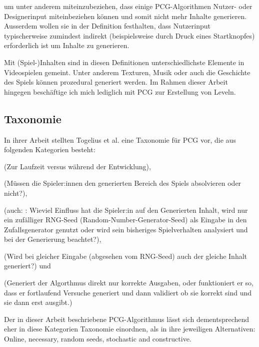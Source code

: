 um unter anderem miteinzubeziehen, dass einige PCG-Algorithmen Nutzer- oder Designerinput miteinbeziehen können und somit nicht mehr  Inhalte generieren. Ausserdem wollen sie in der Definition festhalten, dass Nutzerinput typischerweise zumindest indirekt (beispielsweise durch Druck eines Startknopfes) erforderlich ist um Inhalte zu generieren.

Mit (Spiel-)Inhalten sind in diesen Definitionen unterschiedlichste Elemente in Videospielen gemeint. Unter anderem Texturen, Musik oder auch die Geschichte des Spiels können prozedural generiert werden. Im Rahmen dieser Arbeit hingegen beschäftige ich mich lediglich mit PCG zur Erstellung von Leveln.

\subsection{Taxonomie}

In ihrer Arbeit \cite{sbpcg} stellten Togelius et al. eine Taxonomie für PCG vor, die aus folgenden Kategorien besteht:

 (Zur Laufzeit versus während der Entwicklung),

 (Müssen die Spieler:innen den generierten Bereich des Spiels absolvieren oder nicht?),

 (auch: : Wieviel Einfluss hat die Spieler:in auf den Generierten Inhalt, wird nur ein zufälliger RNG-Seed (Random-Number-Generator-Seed) als Eingabe in den Zufallsgenerator genutzt oder wird sein bisheriges Spielverhalten analysiert und bei der Generierung beachtet?),


 (Wird bei gleicher Eingabe (abgesehen vom RNG-Seed) auch der gleiche Inhalt generiert?) und

 (Generiert der Algorthmus direkt nur korrekte Ausgaben, oder funktioniert er so, dass er fortlaufend Versuche generiert und dann validiert ob sie korrekt sind und sie dann erst ausgibt.) %


Der in dieser Arbeit beschriebene PCG-Algorithmus lässt sich dementsprechend eher in diese Kategorien Taxonomie einordnen, als in ihre jeweiligen Alternativen: Online, necessary, random seeds,
 stochastic and constructive. %

